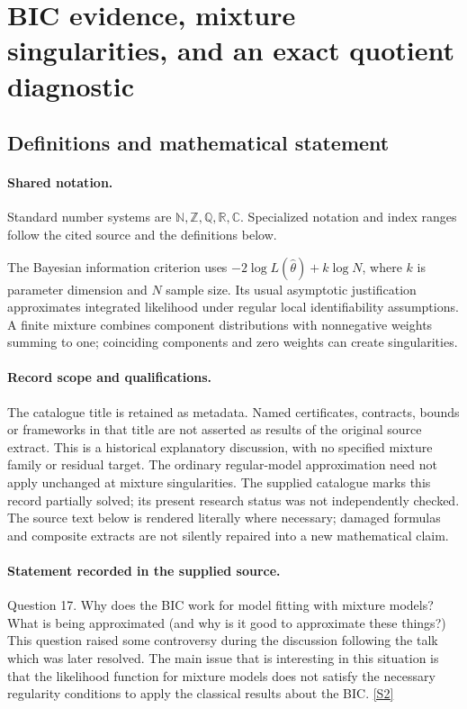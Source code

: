 \documentclass[11pt]{article}
\newcommand{\sref}[2]{\hyperlink{source:#1:#2}{[S#2]}}
\begin{document}
\section{BIC evidence, mixture singularities, and an exact quotient diagnostic}\label{statement}

\subsection{Definitions and mathematical statement}

\paragraph{Shared notation.}Standard number systems are $\mathbb N,\mathbb Z,\mathbb Q,\mathbb R,\mathbb C$. Specialized notation and index ranges follow the cited source and the definitions below.


The Bayesian information criterion uses $-2\log L(\widehat\theta)+k\log N$, where $k$ is parameter dimension and $N$ sample size. Its usual asymptotic justification approximates integrated likelihood under regular local identifiability assumptions. A finite mixture combines component distributions with nonnegative weights summing to one; coinciding components and zero weights can create singularities.
\paragraph{Record scope and qualifications.}
The catalogue title is retained as metadata. Named certificates, contracts, bounds or frameworks in that title are not asserted as results of the original source extract.
This is a historical explanatory discussion, with no specified mixture family or residual target. The ordinary regular-model approximation need not apply unchanged at mixture singularities. The supplied catalogue marks this record partially solved; its present research status was not independently checked.
The source text below is rendered literally where necessary; damaged formulas and composite extracts are not silently repaired into a new mathematical claim.
\paragraph{Statement recorded in the supplied source.}
Question 17. Why does the BIC work for model fitting with mixture models? What is being approximated (and why is it good to approximate these things?) This question raised some controversy during the discussion following the talk which was later resolved. The main issue that is interesting in this situation is that the likelihood function for mixture models does not satisfy the necessary regularity conditions to apply the classical results about the BIC. \sref{statement}{2}
\end{document}

